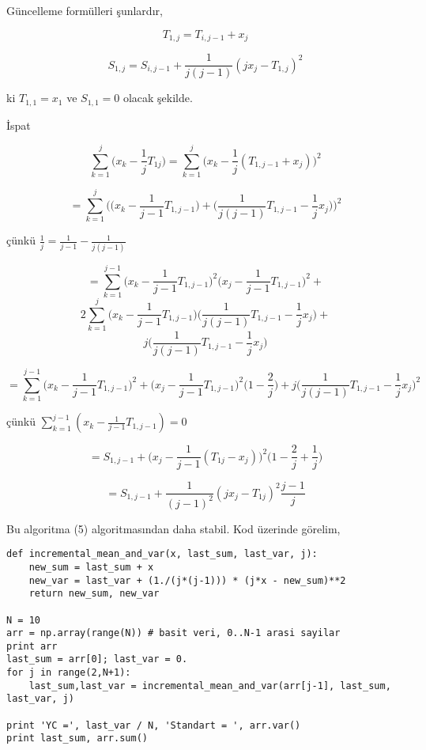 \documentclass[12pt,fleqn]{article}\usepackage{../../common}
\begin{document}
Güncelleme formülleri şunlardır, 

$$ T_{1,j} = T_{i,j-1} + x_j$$

$$ S_{1,j} = S_{i,j-1} + \frac{1}{j(j-1)} (jx_j - T_{1,j})^2  $$

ki $T_{1,1} = x_1$ ve $S_{1,1}=0$ olacak şekilde.

İspat

$$ 
\sum _{k=1}^{j} \bigg( x_k - \frac{1}{j} T_{1j} \bigg) = 
\sum _{k=1}^{j} \bigg( x_k - \frac{1}{j} (T_{1,j-1}+x_j)  \bigg)^2
$$

$$ = \sum _{k=1}^{j} \bigg(
\bigg(x_k - \frac{1}{j-1}T_{1,j-1} \bigg) + 
\bigg( \frac{1}{j(j-1)} T_{1,j-1} - \frac{1}{j} x_j\bigg) 
\bigg)^2
$$

çünkü $\frac{1}{j} = \frac{1}{j-1}-\frac{1}{j(j-1)}$


$$
= \sum _{k=1}^{j-1} \bigg( x_k - \frac{1}{j-1} T_{1,j-1} \bigg)^2  
 \bigg( x_j - \frac{1}{j-1} T_{1,j-1} \bigg)^2 +
$$
$$
2 \sum _{k=1}^{j}  \bigg( x_k - \frac{1}{j-1} T_{1,j-1} \bigg)
\bigg( \frac{1}{j(j-1)} T_{1,j-1} - \frac{1}{j} x_j \bigg) +
$$
$$
j \bigg( \frac{1}{j(j-1)} T_{1,j-1} - \frac{1}{j} x_j \bigg) 
$$

$$ 
= \sum _{k=1}^{j-1} \bigg( x_k - \frac{1}{j-1} T_{1,j-1} \bigg)^2 + 
\bigg( x_j - \frac{1}{j-1} T_{1,j-1} \bigg)^2 \bigg( 1-\frac{2}{j} \bigg) + 
j \bigg( \frac{1}{j(j-1)} T_{1,j-1} - \frac{1}{j}x_j \bigg)^2
$$

çünkü $\sum _{k=1}^{j-1} (x_k-\frac{1}{j-1} T_{1,j-1} )=0$

$$ 
= S_{1,j-1}  + \bigg( x_j - \frac{1}{j-1} (T_{1j}-x_j) \bigg) ^2
\bigg( 1-\frac{2}{j}+\frac{1}{j}\bigg)
$$

$$ = S_{1,j-1} + \frac{1}{(j-1)^2} (jx_j - T_{1j})^2 \frac{j-1}{j} $$

Bu algoritma (5) algoritmasından daha stabil. Kod üzerinde görelim,

\begin{verbatim}
def incremental_mean_and_var(x, last_sum, last_var, j):
    new_sum = last_sum + x
    new_var = last_var + (1./(j*(j-1))) * (j*x - new_sum)**2 
    return new_sum, new_var

N = 10
arr = np.array(range(N)) # basit veri, 0..N-1 arasi sayilar
print arr
last_sum = arr[0]; last_var = 0.
for j in range(2,N+1):
    last_sum,last_var = incremental_mean_and_var(arr[j-1], last_sum, last_var, j)

print 'YC =', last_var / N, 'Standart = ', arr.var()
print last_sum, arr.sum()
\end{verbatim}
\end{document}
